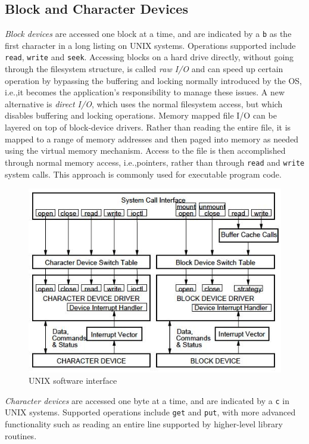 \subsection{Block and Character Devices}
\emph{Block devices} are accessed one block at a time, and are indicated by a \texttt{b} as the first character in a long listing on UNIX systems. Operations supported include \texttt{read}, \texttt{write} and \texttt{seek}. Accessing blocks on a hard drive directly, without going through the filesystem structure, is called \emph{raw I/O} and can speed up certain operation by bypassing the buffering and locking normally introduced by the OS, i.e.,\@ it becomes the application's responsibility to manage these issues. A new alternative is \emph{direct I/O}, which uses the normal filesystem access, but which disables buffering and locking operations. Memory mapped file I/O can be layered on top of block-device drivers. Rather than reading the entire file, it is mapped to a range of memory addresses and then paged into memory as needed using the virtual memory mechanism. Access to the file is then accomplished through normal memory access, i.e.,\@ pointers, rather than through \texttt{read} and \texttt{write} system calls. This approach is commonly used for executable program code.

\begin{figure}[hbtp]
\centering
\includegraphics[scale=0.4]{images/device_management/unix_sw_interface.jpg}
\caption{UNIX software interface}
\end{figure}

\emph{Character devices} are accessed one byte at a time, and are indicated by a \texttt{c} in UNIX systems. Supported operations include \texttt{get} and \texttt{put}, with more advanced functionality such as reading an entire line supported by higher-level library routines.

